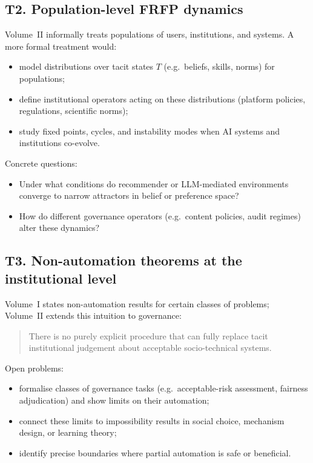 \subsection{T2. Population-level FRFP dynamics}

Volume~II informally treats populations of users, institutions, and
systems.
A more formal treatment would:

\begin{itemize}
  \item model distributions over tacit states \(T\) (e.g.\ beliefs,
        skills, norms) for populations;
  \item define institutional operators acting on these distributions
        (platform policies, regulations, scientific norms);
  \item study fixed points, cycles, and instability modes when AI
        systems and institutions co-evolve.
\end{itemize}

Concrete questions:

\begin{itemize}
  \item Under what conditions do recommender or LLM-mediated
        environments converge to narrow attractors in belief or
        preference space?
  \item How do different governance operators (e.g.\ content policies,
        audit regimes) alter these dynamics?
\end{itemize}

\subsection{T3. Non-automation theorems at the institutional level}

Volume~I states non-automation results for certain classes of
problems; Volume~II extends this intuition to governance:

\begin{quote}
  There is no purely explicit procedure that can fully replace tacit
  institutional judgement about acceptable socio-technical systems.
\end{quote}

Open problems:

\begin{itemize}
  \item formalise classes of governance tasks (e.g.\ acceptable-risk
        assessment, fairness adjudication) and show limits on their
        automation;
  \item connect these limits to impossibility results in social
        choice, mechanism design, or learning theory;
  \item identify precise boundaries where partial automation is safe
        or beneficial.
\end{itemize}

